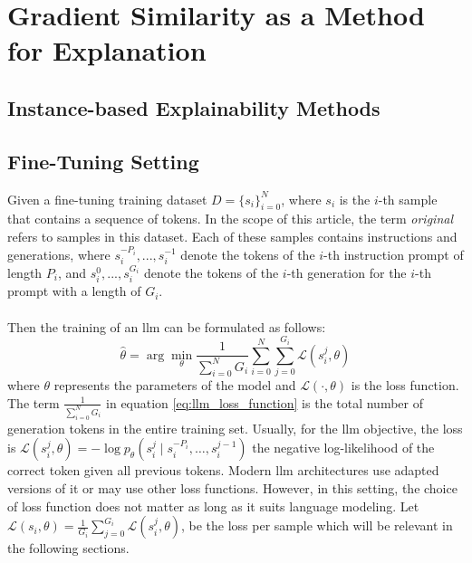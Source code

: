 \chapter{Gradient Similarity as a Method for Explanation}

\section{Instance-based Explainability Methods}

\section{Fine-Tuning Setting}
Given a fine-tuning training dataset $D = \{s_i\}_{i=0}^N$, where $s_i$ is the $i$-th sample that contains a sequence of tokens. In the scope of this article, the term \emph{original} refers to samples in this dataset. Each of these samples contains instructions and generations, where $s_i^{-P_i},...,s_i^{-1}$ denote the tokens of the $i$-th instruction prompt of length $P_i$, and $s_i^0,...,s_i^{G_i}$ denote the tokens of the $i$-th generation for the $i$-th prompt with a length of $G_i$.
\\\\
Then the training of an \acrshort{llm} can be formulated as follows: 
\begin{equation}
    \hat{\theta} = \arg\min_{\theta} \frac{1}{\sum_{i=0}^{N} G_i} \sum_{i=0}^{N} \sum_{j=0}^{G_i} \mathcal{L}(s_i^j, \theta)
    \label{eq:llm_loss_function}
\end{equation}
where $\theta$ represents the parameters of the model and $\mathcal{L}(\cdot, \theta)$ is the loss function. The term $\frac{1}{\sum_{i=0}^{N} G_i}$ in equation \ref{eq:llm_loss_function} is the total number of generation tokens in the entire training set. Usually, for the \acrshort{llm} objective, the loss is $\mathcal{L}(s_i^j, \theta) = -\log p_\theta(s_i^j \mid s_i^{-P_i}, \ldots, s_i^{j-1})$ the negative log-likelihood of the correct token given all previous tokens.  Modern \acrshort{llm} architectures use adapted versions of it or may use other loss functions. However, in this setting, the choice of loss function does not matter as long as it suits language modeling. Let $\mathcal{L}(s_i, \theta) = \frac{1}{G_i} \sum_{j=0}^{G_i} \mathcal{L}(s_i^j, \theta)$, be the loss per sample which will be relevant in the following sections.
